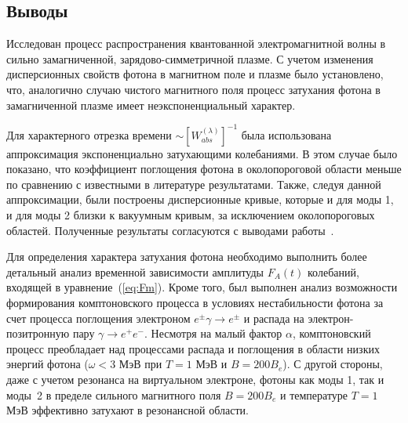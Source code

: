 \newpage

\subsection{Выводы}
Исследован процесс распространения квантованной электромагнитной волны в сильно замагниченной, зарядово-симметричной плазме. С учетом изменения дисперсионных свойств фотона в магнитном поле и плазме было установлено, что, аналогично случаю чистого магнитного поля процесс затухания фотона
в замагниченной плазме имеет неэкспоненциальный характер. 

Для характерного отрезка времени $\sim [W^{{(\lambda)}}_{abs}]^{-1}$ была использована аппроксимация экспоненциально затухающими колебаниями. В этом случае было
показано, что коэффициент поглощения фотона в околопороговой области меньше по сравнению с известными в литературе результатами. Также, следуя данной аппроксимации, были построены дисперсионные кривые, которые и для моды 1, и для моды 2 близки к вакуумным кривым, за исключением околопороговых областей. Полученные результаты согласуются с выводами работы~\cite{Shabad:1988}.

Для определения характера затухания фотона необходимо выполнить более детальный анализ временной зависимости амплитуды $F_A(t)$ колебаний, входящей в уравнение~(\ref{eq:Fm}). Кроме того, был выполнен анализ возможности формирования комптоновского процесса в условиях нестабильности фотона за счет процесса поглощения электроном $e^\pm\gamma\to e^\pm$ и распада на электрон-позитронную пару $\gamma\to e^+e^-$. Несмотря на малый фактор $\alpha$, комптоновский процесс преобладает над процессами распада и поглощения в области низких энергий фотона ($\omega<3$ МэВ при $T=1$ МэВ и $B =200B_e$). С другой стороны, даже с учетом резонанса на виртуальном электроне, фотоны как моды 1, так и моды~2 в пределе сильного магнитного поля $B=200 B_e$ и температуре $T=1$ МэВ эффективно затухают в резонансной области.
